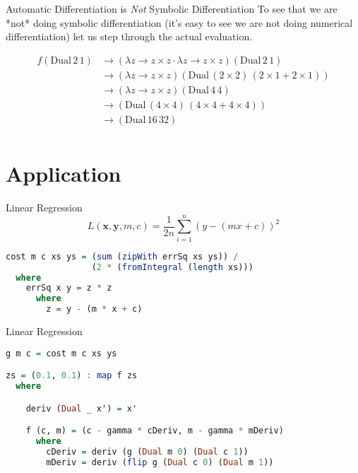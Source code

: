 \documentclass{beamer}
\begin{document}
\begin{frame}[fragile]{Automatic Differentiation is {\em Not} Symbolic
    Differentiation}
To see that we are *not* doing symbolic differentiation (it's easy to
see we are not doing numerical differentiation) let us step
through the actual evaluation.

$$
\begin{aligned}
f (\mathrm{Dual}\,2\,1) &\longrightarrow (\lambda z \rightarrow z
\times z \cdot \lambda z \rightarrow z \times z) (\mathrm{Dual}\,2\,1) \\
&\longrightarrow (\lambda z \rightarrow z
\times z) (\mathrm{Dual}\,(2 \times 2)\,(2 \times 1 + 2 \times 1)) \\
&\longrightarrow  (\lambda z \rightarrow z
\times z) (\mathrm{Dual}\,4\,4)\\
&\longrightarrow (\mathrm{Dual}\,(4 \times 4)\,(4 \times 4 + 4 \times 4)) \\
&\longrightarrow (\mathrm{Dual}\,16\,32)\\
\end{aligned}
$$
\end{frame}

\section{Application}

\begin{frame}[fragile]{Linear Regression}
$$
L(\boldsymbol{x}, \boldsymbol{y}, m, c) = \frac{1}{2n}\sum_{i=1}^n (y - (mx + c))^2
$$
\begin{scriptsize}
\begin{lstlisting}[language=Haskell]
cost m c xs ys = (sum (zipWith errSq xs ys)) /
                 (2 * (fromIntegral (length xs)))
  where
    errSq x y = z * z
      where
        z = y - (m * x + c)
\end{lstlisting}
\end{scriptsize}
\end{frame}

\begin{frame}[fragile]{Linear Regression}
\begin{scriptsize}
\begin{lstlisting}[language=Haskell]
g m c = cost m c xs ys

zs = (0.1, 0.1) : map f zs
  where

    deriv (Dual _ x') = x'

    f (c, m) = (c - gamma * cDeriv, m - gamma * mDeriv)
      where
        cDeriv = deriv (g (Dual m 0) (Dual c 1))
        mDeriv = deriv (flip g (Dual c 0) (Dual m 1))
\end{lstlisting}
\end{scriptsize}
\end{frame}
\end{document}
